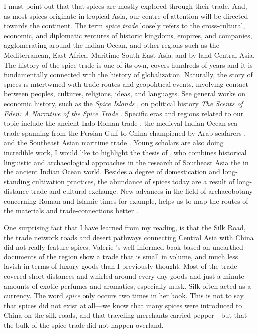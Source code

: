 I must point out that that spices are mostly explored through their trade. And, as most spices originate in tropical Asia, our centre of attention will be directed towards the continent. The term \textit{spice trade} loosely refers to the cross-cultural, economic, and diplomatic ventures of historic kingdoms, empires, and companies, agglomerating around the Indian Ocean, and other regions such as the Mediterranean, East Africa, Maritime South-East Asia, and by land Central Asia. The history of the spice trade is one of its own, covers hundreds of years and it is fundamentally connected with the history of globalization. Naturally, the story of spices is intertwined with trade routes and geopolitical events, involving contact between peoples, cultures, religions, ideas, and languages. See general works on economic history, such as the \textit{Spice Islands} \autocite{burnet_spice_2011}, on political history \textit{The Scents of Eden: A Narrative of the Spice Trade} \autocite{corn_scents_1998}. Specific eras and regions related to our topic include the ancient Indo-Roman trade \autocite{sidebotham_berenike_2011,cobb_indian_2019}, the medieval Indian Ocean sea trade spanning from the Persian Gulf to China championed by Arab seafarers \autocite{hourani_arab_1975, pearson_spices_1996}, and the Southeast Asian maritime trade \autocite{donkin_between_2003,hall_history_2010,reid_southeast_1988}. Young scholars are also doing incredible work, I would like to highlight the thesis of \textcite{hoogervorst_southeast_2012}, who combines historical linguistic and archaeological approaches in the research of Southeast Asia the in the ancient Indian Ocean world. Besides a degree of domestication and long-standing cultivation practices, the abundance of spices today are a result of long-distance trade and cultural exchange. New advances in the field of archaeobotany concerning Roman and Islamic times for example, helps us to map the routes of the materials and trade-connections better \autocites[see][]{van_der_veen_roman_2015}{ van_der_veen_archaeobotany_2018}.

One surprising fact that I have learned from my reading, is that the Silk Road, the trade network roads and desert pathways connecting Central Asia with China did not really feature spices. Valerie \textcite{hansen_silk_2012}'s well informed book based on unearthed documents of the region show a trade that is small in volume, and much less lavish in terms of luxury goods than I previously thought. Most of the trade covered short distances and whirled around every day goods and just a minute amounts of exotic perfumes and aromatics, especially musk. Silk often acted as a currency. The word \textit{spice} only occurs two times in her book. This is not to say that spices did not exist at all---we know that many spices were introduced to China on the silk roads, and that traveling merchants carried pepper---but that the bulk of the spice trade did not happen overland.

